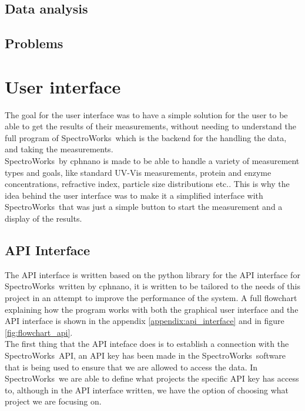 \documentclass{article}
\begin{document}
\subsection{Data analysis}
\subsection{Problems}

\newpage
\section{User interface}
The goal for the user interface was to have a simple solution for the user to be able to get the results of their measurements, without needing to understand the full program of SpectroWorks\texttrademark\ which is the backend for the handling the data, and taking the measurements.\\
SpectroWorks\texttrademark\ by cphnano is made to be able to handle a variety of measurement types and goals, like standard UV-Vis measurements, protein and enzyme concentrations, refractive index, particle size distributions etc.\cite{spectroworks}.
This is why the idea behind the user interface was to make it a simplified interface with SpectroWorks\texttrademark\, that was just a simple button to start the measurement and a display of the results.

\subsection{API Interface}
The API interface is written based on the python library for the API interface for SpectroWorks\texttrademark\ written by cphnano\cite{spectroworks_github}, it is written to be tailored to the needs of this project in an attempt to improve the performance of the system.
A full flowchart explaining how the program works with both the graphical user interface and the API interface is shown in the appendix \ref{appendix:api_interface} and in figure \ref{fig:flowchart_api}.\\

The first thing that the API inteface does is to establish a connection with the SpectroWorks\texttrademark\ API, an API key has been made in the SpectroWorks\texttrademark\ software that is being used to ensure that we are allowed to access the data.
In SpectroWorks\texttrademark\ we are able to define what projects the specific API key has access to, although in the API interface written, we have the option of choosing what project we are focusing on.\\
\end{document}
